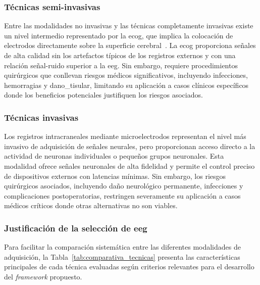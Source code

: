 \subsubsection{Técnicas semi-invasivas}
\label{subsubsec:tecnicas_semi_invasivas}

Entre las modalidades no invasivas y las técnicas completamente invasivas existe un nivel intermedio representado por la \acrfull{ecog}, que implica la colocación de electrodos directamente sobre la superficie cerebral~\cite{dornhege2007toward,schalk2008decoding}. La \acrshort{ecog} proporciona señales de alta calidad sin los artefactos típicos de los registros externos y con una relación señal-ruido superior a la \acrshort{eeg}. Sin embargo, requiere procedimientos quirúrgicos que conllevan riesgos médicos significativos, incluyendo infecciones, hemorragias y \gls{dano_tisular}, limitando su aplicación a casos clínicos específicos donde los beneficios potenciales justifiquen los riesgos asociados.

\subsubsection{Técnicas invasivas}
\label{subsubsec:tecnicas_invasivas}

Los registros intracraneales mediante microelectrodos representan el nivel más invasivo de adquisición de señales neurales, pero proporcionan acceso directo a la actividad de neuronas individuales o pequeños grupos neuronales. Esta modalidad ofrece señales neuronales de alta fidelidad y permite el control preciso de dispositivos externos con latencias mínimas. Sin embargo, los riesgos quirúrgicos asociados, incluyendo daño neurológico permanente, infecciones y complicaciones postoperatorias, restringen severamente su aplicación a casos médicos críticos donde otras alternativas no son viables.

\subsubsection{Justificación de la selección de \acrshort{eeg}}
\label{subsubsec:justificacion_eeg}

Para facilitar la comparación sistemática entre las diferentes modalidades de adquisición, la Tabla~\ref{tab:comparativa_tecnicas} presenta las características principales de cada técnica evaluadas según criterios relevantes para el desarrollo del \textit{\gls{framework}} propuesto.

